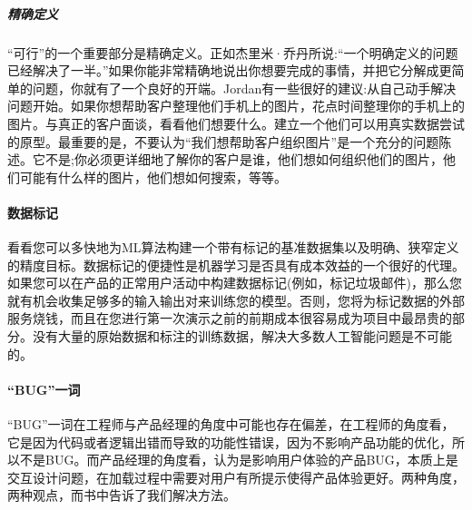 \documentclass[letterpaper,11pt,english]{sphinxmanual}
\begin{document}
\subparagraph{精确定义}
\label{\detokenize{chapter_idea/understand_tech:id39}}
“可行”的一个重要部分是精确定义。正如杰里米·乔丹所说:“一个明确定义的问题已经解决了一半。”如果你能非常精确地说出你想要完成的事情，并把它分解成更简单的问题，你就有了一个良好的开端。Jordan有一些很好的建议:从自己动手解决问题开始。如果你想帮助客户整理他们手机上的图片，花点时间整理你的手机上的图片。与真正的客户面谈，看看他们想要什么。建立一个他们可以用真实数据尝试的原型。最重要的是，不要认为“我们想帮助客户组织图片”是一个充分的问题陈述。它不是;你必须更详细地了解你的客户是谁，他们想如何组织他们的图片，他们可能有什么样的图片，他们想如何搜索，等等。


\paragraph{数据标记}
\label{\detokenize{chapter_idea/understand_tech:id40}}
看看您可以多快地为ML算法构建一个带有标记的基准数据集以及明确、狭窄定义的精度目标。数据标记的便捷性是机器学习是否具有成本效益的一个很好的代理。如果您可以在产品的正常用户活动中构建数据标记(例如，标记垃圾邮件)，那么您就有机会收集足够多的输入\sphinxhyphen{}输出对来训练您的模型。否则，您将为标记数据的外部服务烧钱，而且在您进行第一次演示之前的前期成本很容易成为项目中最昂贵的部分。没有大量的原始数据和标注的训练数据，解决大多数人工智能问题是不可能的。


\paragraph{“BUG”一词}
\label{\detokenize{chapter_idea/understand_tech:bug}}
“BUG”一词在工程师与产品经理的角度中可能也存在偏差，在工程师的角度看，它是因为代码或者逻辑出错而导致的功能性错误，因为不影响产品功能的优化，所以不是BUG。而产品经理的角度看，认为是影响用户体验的产品BUG，本质上是交互设计问题，在加载过程中需要对用户有所提示使得产品体验更好。两种角度，两种观点，而书中告诉了我们解决方法。
\end{document}
